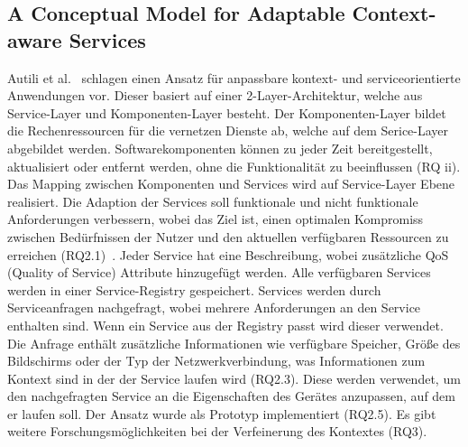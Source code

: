 \documentclass[conference,compsoc]{IEEEtran}
\begin{document}
\subsection{A Conceptual Model for Adaptable Context-aware Services}
Autili et al.~\cite{autili2006conceptual} schlagen einen Ansatz für anpassbare kontext- und serviceorientierte Anwendungen vor. Dieser basiert auf einer 2-Layer-Architektur, welche aus Service-Layer und Komponenten-Layer besteht. Der Komponenten-Layer bildet die Rechenressourcen für die vernetzen Dienste ab, welche auf dem Serice-Layer abgebildet werden. Softwarekomponenten können zu jeder Zeit bereitgestellt, aktualisiert oder entfernt werden, ohne die Funktionalität zu beeinflussen (RQ ii). Das Mapping zwischen Komponenten und Services wird auf Service-Layer Ebene realisiert.
Die Adaption der Services soll funktionale und nicht funktionale Anforderungen verbessern, wobei das Ziel ist, einen optimalen Kompromiss zwischen Bedürfnissen der Nutzer und den aktuellen verfügbaren Ressourcen zu erreichen (RQ2.1)~\cite{autili2006conceptual}. Jeder Service hat eine Beschreibung, wobei zusätzliche QoS (Quality of Service) Attribute hinzugefügt werden. Alle verfügbaren Services werden in einer Service-Registry gespeichert. Services werden durch Serviceanfragen nachgefragt, wobei mehrere Anforderungen an den Service enthalten sind. Wenn ein Service aus der Registry passt wird dieser verwendet. Die Anfrage enthält zusätzliche Informationen wie verfügbare Speicher, Größe des Bildschirms oder der Typ der Netzwerkverbindung, was Informationen zum Kontext sind in der der Service laufen wird (RQ2.3). Diese werden verwendet, um den nachgefragten Service an die Eigenschaften des Gerätes anzupassen, auf dem er laufen soll.
Der Ansatz wurde als Prototyp implementiert (RQ2.5). Es gibt weitere Forschungsmöglichkeiten bei der Verfeinerung des Kontextes (RQ3).
\end{document}
